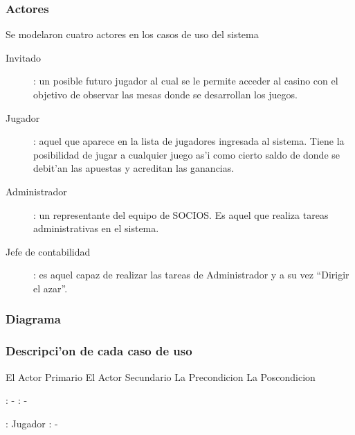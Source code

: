 \subsubsection{Actores}
Se modelaron cuatro actores en los casos de uso del sistema

\begin{description}
\item[Invitado]: un posible futuro jugador al cual se le permite acceder al casino con el objetivo de observar las mesas donde se desarrollan los juegos.
\item[Jugador]: aquel que aparece en la lista de jugadores ingresada al sistema. Tiene la posibilidad de jugar a cualquier juego as'i como cierto saldo de donde se debit'an las apuestas y acreditan las ganancias.
\item[Administrador]: un representante del equipo de SOCIOS. Es aquel que realiza tareas administrativas en el sistema.
\item[Jefe de contabilidad]: es aquel capaz de realizar las tareas de Administrador y a su vez ``Dirigir el azar''.
\end{description}



\subsubsection{Diagrama}


\subsubsection{Descripci'on de cada caso de uso}


 {El Actor Primario} {El Actor Secundario} {La Precondicion } {La Poscondicion}






: - \newline
\indent{}: -

: Jugador \newline
\indent{}: -

